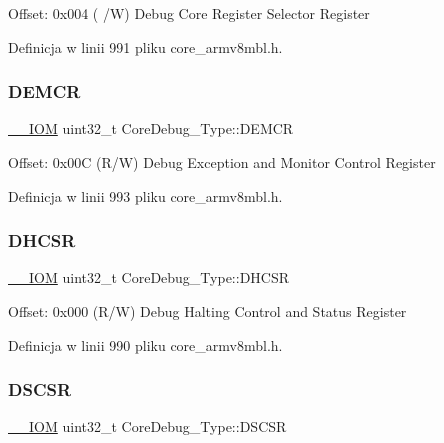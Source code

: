 Offset\+: 0x004 ( /W) Debug Core Register Selector Register 

Definicja w linii 991 pliku core\+\_\+armv8mbl.\+h.

\mbox{\label{struct_core_debug___type_aeb3126abc4c258a858f21f356c0df6ee}} 
\subsubsection{\texorpdfstring{D\+E\+M\+CR}{DEMCR}}
{\footnotesize\ttfamily \hyperlink{core__sc300_8h_ab6caba5853a60a17e8e04499b52bf691}{\+\_\+\+\_\+\+I\+OM} uint32\+\_\+t Core\+Debug\+\_\+\+Type\+::\+D\+E\+M\+CR}

Offset\+: 0x00C (R/W) Debug Exception and Monitor Control Register 

Definicja w linii 993 pliku core\+\_\+armv8mbl.\+h.

\mbox{\label{struct_core_debug___type_ad63554e4650da91a8e79929cbb63db66}} 
\subsubsection{\texorpdfstring{D\+H\+C\+SR}{DHCSR}}
{\footnotesize\ttfamily \hyperlink{core__sc300_8h_ab6caba5853a60a17e8e04499b52bf691}{\+\_\+\+\_\+\+I\+OM} uint32\+\_\+t Core\+Debug\+\_\+\+Type\+::\+D\+H\+C\+SR}

Offset\+: 0x000 (R/W) Debug Halting Control and Status Register 

Definicja w linii 990 pliku core\+\_\+armv8mbl.\+h.

\mbox{\label{struct_core_debug___type_ad9fa5e915e038e20b9be88d54d432fb8}} 
\subsubsection{\texorpdfstring{D\+S\+C\+SR}{DSCSR}}
{\footnotesize\ttfamily \hyperlink{core__sc300_8h_ab6caba5853a60a17e8e04499b52bf691}{\+\_\+\+\_\+\+I\+OM} uint32\+\_\+t Core\+Debug\+\_\+\+Type\+::\+D\+S\+C\+SR}

